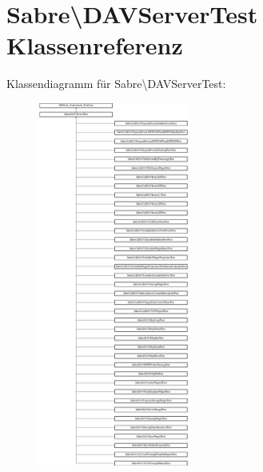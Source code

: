 \hypertarget{class_sabre_1_1_d_a_v_server_test}{}\section{Sabre\textbackslash{}D\+A\+V\+Server\+Test Klassenreferenz}
\label{class_sabre_1_1_d_a_v_server_test}
Klassendiagramm für Sabre\textbackslash{}D\+A\+V\+Server\+Test\+:\begin{figure}[H]
\begin{center}
\leavevmode
\includegraphics[height=12.000000cm]{class_sabre_1_1_d_a_v_server_test}
\end{center}
\end{figure}
